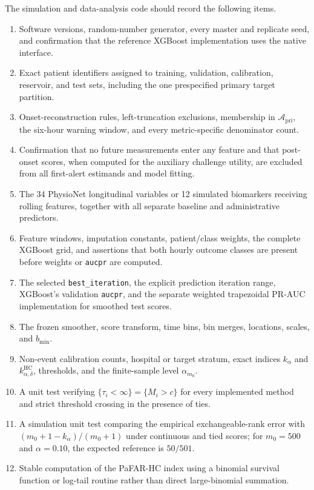 \documentclass[11pt]{article}
\begin{document}
The simulation and data-analysis code should record the following items.
\begin{enumerate}
    \item Software versions, random-number generator, every master and replicate seed, and confirmation that the reference XGBoost implementation uses the native interface.
    \item Exact patient identifiers assigned to training, validation, calibration, reservoir, and test sets, including the one prespecified primary target partition.
    \item Onset-reconstruction rules, left-truncation exclusions, membership in $\mathcal A_{\mathrm{pri}}$, the six-hour warning window, and every metric-specific denominator count.
    \item Confirmation that no future measurements enter any feature and that post-onset scores, when computed for the auxiliary challenge utility, are excluded from all first-alert estimands and model fitting.
    \item The 34 PhysioNet longitudinal variables or 12 simulated biomarkers receiving rolling features, together with all separate baseline and administrative predictors.
    \item Feature windows, imputation constants, patient/class weights, the complete XGBoost grid, and assertions that both hourly outcome classes are present before weights or \texttt{aucpr} are computed.
    \item The selected \texttt{best\_iteration}, the explicit prediction iteration range, XGBoost's validation \texttt{aucpr}, and the separate weighted trapezoidal PR-AUC implementation for smoothed test scores.
    \item The frozen smoother, score transform, time bins, bin merges, locations, scales, and $b_{\min}$.
    \item Non-event calibration counts, hospital or target stratum, exact indices $k_{\alpha}$ and $k_{\alpha,\delta}^{\mathrm{HC}}$, thresholds, and the finite-sample level $\alpha_{m_0}$.
    \item A unit test verifying $\{\tau_i<\infty\}=\{M_i>c\}$ for every implemented method and strict threshold crossing in the presence of ties.
    \item A simulation unit test comparing the empirical exchangeable-rank error with $(m_0+1-k_{\alpha})/(m_0+1)$ under continuous and tied scores; for $m_0=500$ and $\alpha=0.10$, the expected reference is $50/501$.
    \item Stable computation of the PaFAR-HC index using a binomial survival function or log-tail routine rather than direct large-binomial summation.

\end{enumerate}
\end{document}
